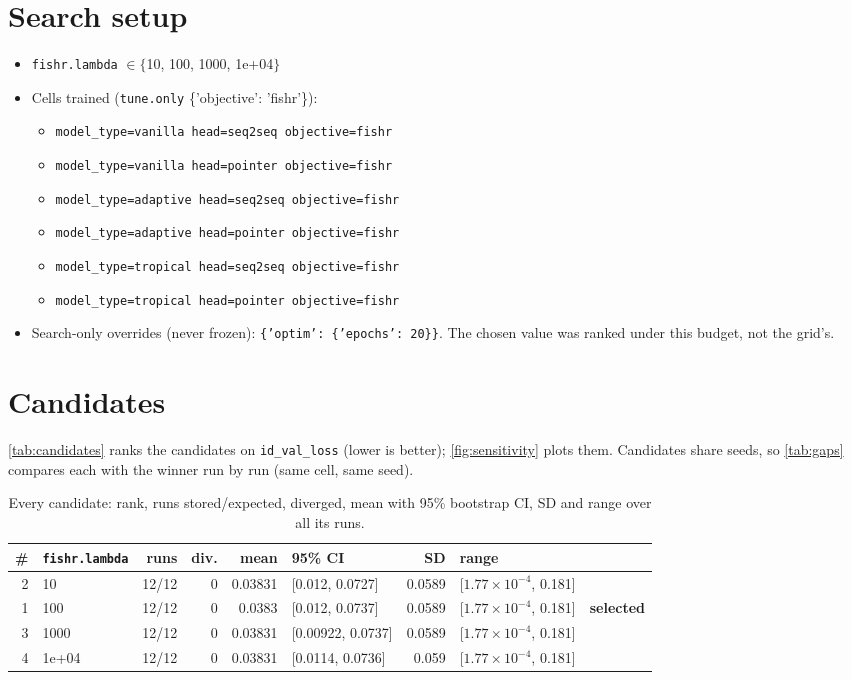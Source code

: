 \documentclass[10pt]{article}
\begin{document}
\section{Search setup}
\begin{itemize}\setlength\itemsep{0pt}
\item \texttt{fishr.lambda} $\in \{$10, 100, 1000, 1e+04$\}$
\item Cells trained (\texttt{tune.only} \{'objective': 'fishr'\}):
\begin{itemize}\setlength\itemsep{0pt}
\item \texttt{model\_type=vanilla head=seq2seq objective=fishr}
\item \texttt{model\_type=vanilla head=pointer objective=fishr}
\item \texttt{model\_type=adaptive head=seq2seq objective=fishr}
\item \texttt{model\_type=adaptive head=pointer objective=fishr}
\item \texttt{model\_type=tropical head=seq2seq objective=fishr}
\item \texttt{model\_type=tropical head=pointer objective=fishr}
\end{itemize}
\item Search-only overrides (never frozen): \texttt{\{'optim': \{'epochs': 20\}\}}. The chosen value was ranked under this budget, not the grid's.
\end{itemize}

\section{Candidates}
\autoref{tab:candidates} ranks the candidates on \texttt{id\_val\_loss} (lower is better); \autoref{fig:sensitivity} plots them.
Candidates share seeds, so \autoref{tab:gaps} compares each with the winner run by run (same cell, same seed).

{\small
\begin{longtable}{rlrrrlrll}
\caption{Every candidate: rank, runs stored/expected, diverged, mean with 95\% bootstrap CI, SD and range over all its runs.}\label{tab:candidates}\\
\toprule
\# & \texttt{fishr.lambda} & runs & div. & mean & 95\% CI & SD & range & \\
\midrule
\endhead
2 & 10 & 12/12 & 0 & 0.03831 & [0.012, 0.0727] & 0.0589 & [$1.77\times10^{-4}$, 0.181] & \\
1 & 100 & 12/12 & 0 & 0.0383 & [0.012, 0.0737] & 0.0589 & [$1.77\times10^{-4}$, 0.181] & \textbf{selected}\\
3 & 1000 & 12/12 & 0 & 0.03831 & [0.00922, 0.0737] & 0.0589 & [$1.77\times10^{-4}$, 0.181] & \\
4 & 1e+04 & 12/12 & 0 & 0.03831 & [0.0114, 0.0736] & 0.059 & [$1.77\times10^{-4}$, 0.181] & \\
\bottomrule
\end{longtable}
}
\end{document}

